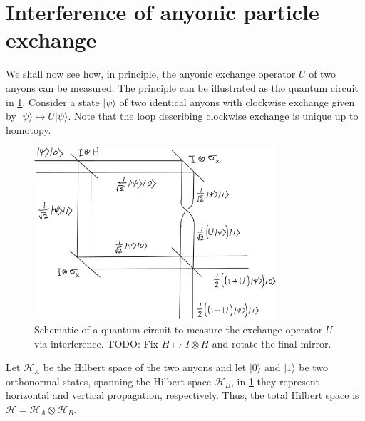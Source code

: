 \section{Interference of anyonic particle exchange}

We shall now see how, in principle, the anyonic exchange operator $U$ of two anyons can be measured. The principle can be illustrated as the quantum circuit in \cref{fig:exchange interference}. Consider a state $|ψ⟩$ of two identical anyons with clockwise exchange given by $|ψ⟩ ↦ U|ψ⟩$. Note that the loop describing clockwise exchange is unique up to homotopy.

\begin{figure}
  \centering
  \includegraphics[width=0.8\textwidth]{img/exchange-interference-cropped.png}
  \caption{Schematic of a quantum circuit to measure the exchange operator $U$ via interference. TODO: Fix $H ↦ I⊗H$ and rotate the final mirror.}
  \label{fig:exchange interference}
\end{figure}

Let $\mathcal{H}_A$ be the Hilbert space of the two anyons and let $|0⟩$ and $|1⟩$ be two orthonormal states, spanning the Hilbert space $\mathcal{H}_B$, in \cref{fig:exchange interference} they represent horizontal and vertical propagation, respectively. Thus, the total Hilbert space is $\mathcal{H} = \mathcal{H}_A⊗\mathcal{H}_B$.


